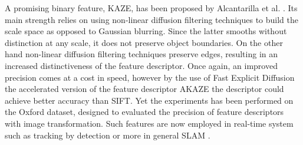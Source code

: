 A promising binary feature, KAZE, has been proposed by Alcantarilla et al. \cite{alcantarilla12}. Its main strength relies on using non-linear diffusion filtering techniques \cite{weickert98} to build the scale space as opposed to Gaussian blurring. Since the latter smooths without distinction at any scale, it does not preserve object boundaries. On the other hand non-linear diffusion filtering techniques preserve edges, resulting in an increased distinctiveness of the feature descriptor. Once again, an improved precision comes at a cost in speed, however by the use of Fast Explicit Diffusion \cite{goesele2010} the accelerated version of the feature descriptor AKAZE \cite{alcantarilla13} the descriptor could achieve better accuracy than SIFT. Yet the experiments has been performed on the Oxford dataset, designed to evaluated the precision of feature descriptors with image transformation. Such features are now employed in real-time system such as tracking by detection \cite{nebehay2014,pieropan15,pieropan15b} or more in general SLAM \cite{murartal2015}. 

